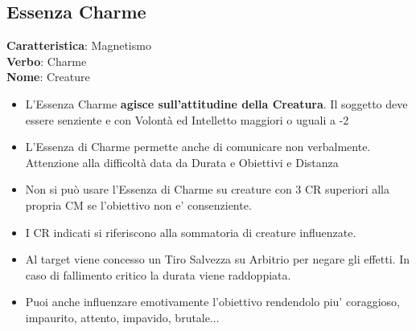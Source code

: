 \documentclass[a4paper,11pt,twoside,openany]{book}
\begin{document}
\pagebreak

\subsection{Essenza Charme}

\textbf{Caratteristica}: Magnetismo\\
\textbf{Verbo}: Charme\\
\textbf{Nome}: Creature\\

\label{essenza-charme---magnetismo}

\begin{itemize}
	\item
	      L'Essenza Charme \textbf{agisce sull'attitudine della Creatura}. Il soggetto deve essere senziente e con Volontà ed Intelletto maggiori o uguali a -2
	\item
	      L'Essenza di Charme permette anche di comunicare non verbalmente. Attenzione alla difficoltà data da Durata e Obiettivi e Distanza
	\item
	      Non si può usare l'Essenza di Charme su creature con 3 CR superiori alla propria CM se l'obiettivo non e' consenziente.
	\item
	      I CR indicati si riferiscono alla sommatoria di creature influenzate.
	\item
	      Al target viene concesso un Tiro Salvezza su Arbitrio per negare gli effetti. In caso di fallimento critico la durata viene raddoppiata.
	\item
		Puoi anche influenzare emotivamente l'obiettivo rendendolo piu' coraggioso, impaurito, attento, impavido, brutale...      
\end{itemize}

\medskip
\end{document}
